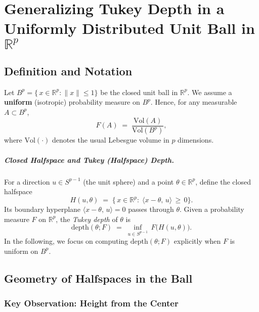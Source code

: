 \chapter{Generalizing Tukey Depth in a Uniformly Distributed Unit Ball in \(\mathbb{R}^p\)}

\section{Definition and Notation}

Let \(B^p = \bigl\{\,x \in \mathbb{R}^p : \|x\|\le 1\bigr\}\) be the closed unit ball in \(\mathbb{R}^p\). 
We assume a \textbf{uniform} (isotropic) probability measure on \(B^p\). 
Hence, for any measurable \(A \subset B^p\),
\[
F(A) \;=\; \frac{\mathrm{Vol}(A)}{\mathrm{Vol}(B^p)},
\]
where \(\mathrm{Vol}(\cdot)\) denotes the usual Lebesgue volume in \(p\) dimensions.

\paragraph{Closed Halfspace and Tukey (Halfspace) Depth.}
For a direction \(u \in S^{p-1}\) (the unit sphere) and a point \(\theta \in \mathbb{R}^p\), define the closed halfspace
\[
H(u,\theta) 
\;=\;
\bigl\{\,
x \in \mathbb{R}^p 
:\;
\langle x - \theta,\,u\rangle 
\,\ge\, 
0
\bigr\}.
\]
Its boundary hyperplane \(\langle x - \theta,\,u\rangle = 0\) passes through \(\theta\). 
Given a probability measure \(F\) on \(\mathbb{R}^p\), the \emph{Tukey depth} of \(\theta\) is
\[
\mathrm{depth}(\theta; F)
\;=\;
\inf_{u \in S^{p-1}}\,
F\bigl(H(u,\theta)\bigr).
\]
In the following, we focus on computing \(\mathrm{depth}(\theta;F)\) explicitly when \(F\) is uniform on \(B^p\).

\section{Geometry of Halfspaces in the Ball}

\subsection{Key Observation: Height from the Center}

